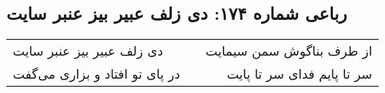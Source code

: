\begin{center}
\section*{رباعی شماره ۱۷۴: دی زلف عبیر بیز عنبر سایت}
\label{sec:sh174}
\begin{longtable}{l p{0.5cm} r}
دی زلف عبیر بیز عنبر سایت
&&
از طرف بناگوش سمن سیمایت
\\
در پای تو افتاد و بزاری می‌گفت
&&
سر تا پایم فدای سر تا پایت
\\
\end{longtable}
\end{center}
